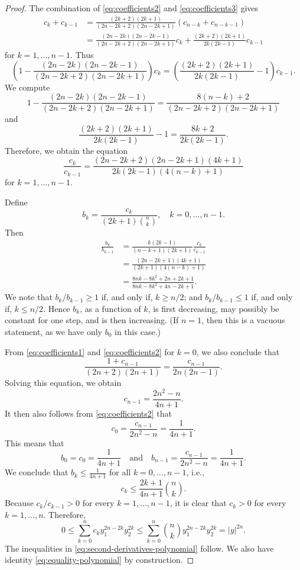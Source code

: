 \documentclass[10pt,a4paper]{amsart}
\begin{document}
\begin{proof}
The combination of \eqref{eq:coefficients2} and \eqref{eq:coefficients3} gives
\[
\begin{split}
c_k + c_{k - 1} & = \frac{(2k + 2)(2 k + 1)}{(2n - 2k + 2)(2n - 2k + 1)}(c_{n - k} + c_{n - k - 1}) \\
& = \frac{(2n - 2k)(2n - 2k - 1)}{(2n - 2k + 2)(2n - 2k + 1)} c_k + \frac{(2k + 2)(2 k + 1)}{2k(2k - 1)} c_{k - 1}
\end{split}
\]
for $k = 1, \dotsc, n - 1$. Thus
\[
\left(1 - \frac{(2n - 2k)(2n - 2k - 1)}{(2n - 2k + 2)(2n - 2k + 1)}\right) c_k = \left(\frac{(2k + 2)(2 k + 1)}{2k(2k - 1)} - 1\right) c_{k - 1}.
\]
We compute
\[
1 - \frac{(2n - 2k)(2n - 2k - 1)}{(2n - 2k + 2)(2n - 2k + 1)} = \frac{8(n - k) + 2}{(2n - 2k + 2)(2n - 2k + 1)}
\]
and
\[
\frac{(2k + 2)(2 k + 1)}{2k(2k - 1)} - 1 = \frac{8k + 2}{2k(2k - 1)}.
\]
Therefore, we obtain the equation
\[
\frac{c_k}{c_{k - 1}} = \frac{(2n - 2k + 2)(2n - 2k + 1)(4k + 1)}{2k(2k - 1)(4(n - k) + 1)}
\]
for $k = 1, \dotsc, n - 1$.

Define
\[
b_k = \frac{c_k}{(2k + 1)\binom{n}{k}}, \quad k = 0, \dotsc, n - 1.
\]
Then
\[
\begin{split}
\frac{b_k}{b_{k - 1}} & = \frac{k(2k - 1)}{(n - k + 1)(2k + 1)} \frac{c_k}{c_{k - 1}} \\
& = \frac{(2n - 2k + 1)(4k + 1)}{(2k + 1)(4(n - k) + 1)} \\
& = \frac{8nk - 8k^2 + 2n + 2k + 1}{8nk - 8k^2 + 4n - 2k + 1}.
\end{split}
\]
We note that $b_k/b_{k - 1} \ge 1$ if, and only if, $k \ge n/2$; and
$b_k/b_{k - 1} \le 1$ if, and only if, $k \le n/2$.
Hence $b_k$, as a function of $k$, is first decreasing, may possibly be constant
for one step, and is then increasing. (If $n = 1$, then this is a vacuous statement, as
we have only $b_0$ in this case.)

From \eqref{eq:coefficients1} and \eqref{eq:coefficients2} for $k = 0$, we also
conclude that
\[
\frac{1 + c_{n - 1}}{(2n + 2)(2n + 1)} = \frac{c_{n - 1}}{2n(2n - 1)}.
\]
Solving this equation, we obtain
\[
c_{n - 1} = \frac{2n^2 - n}{4n + 1}.
\]
It then also follows from \eqref{eq:coefficients2} that
\[
c_0 = \frac{c_{n - 1}}{2n^2 - n} = \frac{1}{4n + 1}.
\]
This means that
\[
b_0 = c_0 = \frac{1}{4n + 1} \quad \text{and} \quad b_{n - 1} = \frac{c_{n - 1}}{2n^2 - n} = \frac{1}{4n + 1}.
\]
We conclude that $b_k \le \frac{1}{4n + 1}$ for all $k = 0, \dotsc, n - 1$,
i.e.,
\[
c_k \le \frac{2k + 1}{4n + 1} \binom{n}{k}.
\]
Because $c_k/c_{k - 1} > 0$ for every $k = 1, \dotsc, n - 1$, it is clear that
$c_k > 0$ for every $k = 1, \dotsc, n$. Therefore,
\[
0 \le \sum_{k = 0}^n c_k y_1^{2n - 2k} y_2^{2k} \le \sum_{k = 0}^n \binom{n}{k} y_1^{2n - 2k} y_2^{2k} = |y|^{2n}.
\]
The inequalities in \eqref{eq:second-derivatives-polynomial} follow.
We also have identity \eqref{eq:equality-polynomial} by construction.
\end{proof}
\end{document}
